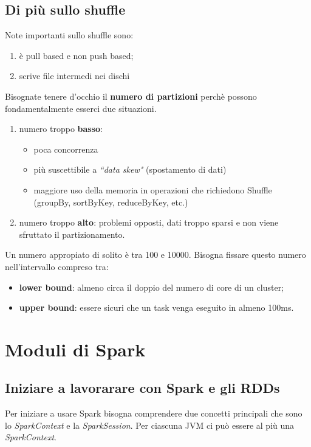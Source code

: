 \documentclass[12pt,italian]{article}
\begin{document}
\subsection{Di più sullo shuffle}
Note importanti sullo shuffle sono:
\begin{enumerate}
	\item è pull based e non push based;
	\item scrive file intermedi nei dischi
\end{enumerate}
Bisognate tenere d'occhio il \textbf{numero di partizioni} perchè possono fondamentalmente esserci due situazioni.
\begin{enumerate}
	\item numero troppo \textbf{basso}:
	\begin{itemize}
		\item poca concorrenza
		\item più suscettibile a \textit{``data skew"} (spostamento di dati)
		\item maggiore uso della memoria in operazioni che richiedono Shuffle (groupBy, sortByKey, reduceByKey, etc.)
	\end{itemize}
	\item numero troppo \textbf{alto}: problemi opposti, dati troppo sparsi e non viene sfruttato il partizionamento.
\end{enumerate}
Un numero appropiato di solito è tra 100 e 10000.
Bisogna fissare questo numero nell'intervallo compreso tra:
\begin{itemize}
	\item \textbf{lower bound}:  almeno circa il doppio del numero di core di un cluster;
	\item \textbf{upper bound}: essere sicuri che un task venga eseguito in almeno 100ms.
\end{itemize}


\section{Moduli di Spark}
\subsection{Iniziare a lavorarare con Spark e gli RDDs}
Per iniziare a usare Spark bisogna comprendere due concetti principali che sono lo \textit{SparkContext} e la \textit{SparkSession}. %
Per ciascuna JVM ci può essere al più una \textit{SparkContext}.
\end{document}
